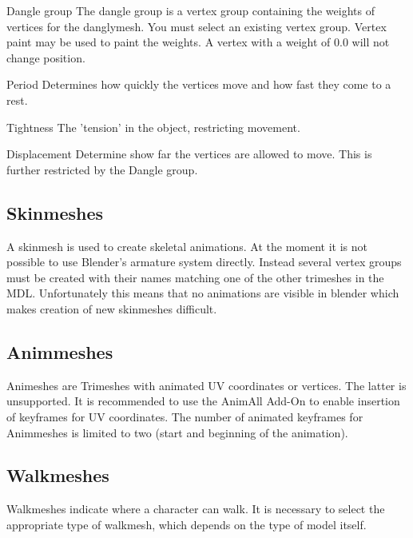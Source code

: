 \begin{propertyAurora}{Dangle group} 
The dangle group is a vertex group containing the weights of vertices for the danglymesh. 
You must select an existing vertex group. Vertex paint may be used to paint the weights. A vertex with a weight of
0.0 will not change position.
\end{propertyAurora}

\begin{propertyAurora}{Period} 
Determines how quickly the vertices move and how fast they come to a rest.
\end{propertyAurora}
\begin{propertyAurora}{Tightness} 
The 'tension' in the object, restricting movement. 
\end{propertyAurora}
\begin{propertyAurora}{Displacement} 
Determine show far the vertices are allowed to move. This is further restricted by the Dangle group.
\end{propertyAurora}


\subsection{Skinmeshes}
A skinmesh is used to create skeletal animations. At the moment it is not 
possible to use Blender's armature system directly. Instead several vertex groups 
must be created with their names matching one of the other trimeshes in the MDL. 
Unfortunately this means that no animations are visible in blender which makes
creation of new skinmeshes difficult.


\subsection{Animmeshes}
Animeshes are Trimeshes with animated UV coordinates or vertices. The latter is unsupported. 
It is recommended to use the AnimAll Add-On to enable insertion of keyframes 
for UV coordinates. The number of animated keyframes for Animmeshes is limited to 
two (start and beginning of 
the animation).


\subsection{Walkmeshes}
Walkmeshes indicate where a character can walk. It is necessary to select 
the appropriate type of walkmesh, which depends on the type of model itself. 

